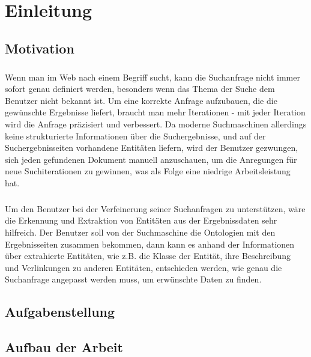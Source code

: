 \chapter{Einleitung}

\section{Motivation}
\label{sec:Motivation}
\paragraph{}
Wenn man im Web nach einem Begriff sucht, kann die Suchanfrage nicht immer sofort genau definiert werden, besonders wenn das Thema der Suche dem Benutzer nicht bekannt ist. Um eine korrekte Anfrage aufzubauen, die die gewünschte Ergebnisse liefert, braucht man mehr Iterationen - mit jeder Iteration wird die Anfrage präzisiert und verbessert. Da moderne Suchmaschinen allerdings keine strukturierte Informationen über die Suchergebnisse, und auf der Suchergebnisseiten vorhandene Entitäten liefern, wird der Benutzer gezwungen, sich jeden gefundenen Dokument manuell anzuschauen, um die Anregungen für neue Suchiterationen zu gewinnen, was als Folge eine niedrige Arbeitsleistung hat.

\paragraph{}
Um den Benutzer bei der Verfeinerung seiner Suchanfragen zu unterstützen, wäre die Erkennung und Extraktion von Entitäten aus der Ergebnissdaten sehr hilfreich. Der Benutzer soll von der Suchmaschine die Ontologien mit den Ergebnisseiten zusammen bekommen, dann kann es anhand der Informationen über extrahierte Entitäten, wie z.B. die Klasse der Entität, ihre Beschreibung und Verlinkungen zu anderen Entitäten, entschieden werden, wie genau die Suchanfrage angepasst werden muss, um erwünschte Daten zu finden.

\section{Aufgabenstellung}
\label{sec:Aufgabenstellung}

\section{Aufbau der Arbeit}
\label{sec:Aufbau der Arbeit}